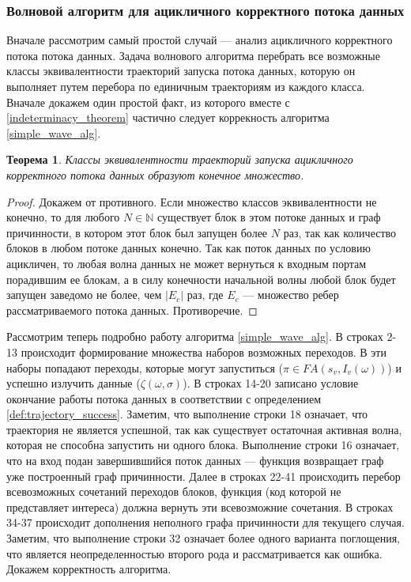 \documentclass[10pt,a4paper]{article}
\newtheorem{theorem}{Теорема}
\newcommand{\FA}{F\!A}
\begin{document}
\subsubsection{Волновой алгоритм для ацикличного корректного потока данных}
  Вначале рассмотрим самый простой случай --- анализ ацикличного корректного потока потока данных. Задача волнового алгоритма
  перебрать все возможные классы эквивалентности траекторий запуска потока данных, которую он выполняет путем перебора по единичным траекториям из каждого класса.
  Вначале докажем один простой факт, из которого вместе с \ref{indeterminacy_theorem} частично следует коррекность алгоритма \ref{simple_wave_alg}.
  
  \begin{theorem}
    \label{finite_theorem}
    Классы эквивалентности траекторий запуска ацикличного корректного потока данных образуют конечное множество.
  \end{theorem}
  \begin{proof}
    Докажем от противного. Если множество классов эквивалентности не конечно, то для любого $N \in \mathbb{N}$ существует блок в этом потоке данных и граф причинности,
    в котором этот блок был запущен более $N$ раз, так как количество блоков в любом потоке данных конечно. Так как поток данных по условию ацикличен, то
    любая волна данных не может вернуться к входным портам порадившим ее блокам, а в силу конечности начальной волны любой блок будет запущен
    заведомо не более, чем $\lvert E_c \rvert$ раз, где $E_c$ --- множество ребер рассматриваемого потока данных. Противоречие.
  \end{proof}
  
  Рассмотрим теперь подробно работу алгоритма \ref{simple_wave_alg}. В строках 2-13 происходит формирование множества наборов возможных переходов.
  В эти наборы попадают переходы, которые могут запуститься ($\pi \in \FA(s_v, I_v(\omega))$) и успешно излучить данные ($\zeta(\omega, \sigma)$).
  В строках 14-20 записано условие окончание работы потока данных в соответствии с определением \ref{def:trajectory_success}. Заметим, что выполнение
  строки 18 означает, что траектория не является успешной, так как существует остаточная активная волна, которая не способна запустить ни одного блока.
  Выполнение строки 16 означает, что на вход подан завершившийся поток данных --- функция возвращает граф уже построенный граф причинности.
  Далее в строках 22-41 происходить перебор всевозможных сочетаний переходов блоков, функция  (код которой не представляет интереса) должна вернуть
  эти всевозможние сочетания. В строках 34-37 происходит дополнения неполного графа причинности для текущего случая.
  Заметим, что выполнение строки 32 означает более одного варианта поглощения, что является неопределенностью второго рода и рассматривается как ошибка.
  Докажем корректность алгоритма.
  
\end{document}
